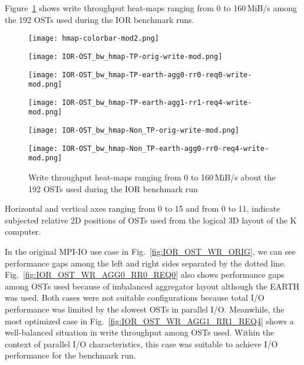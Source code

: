 \documentclass{jhps}
\begin{document}
Figure~\ref{fig:IOR_OST_BW_HMAP_WR} shows write throughput heat-maps
ranging from 0 to 160\,MiB/s
among the 192 OSTs used during the IOR benchmark runs.
%
\begin{figure}[tb]
\begin{minipage}[t]{0.06\textwidth}
 \texttt{[image: hmap-colorbar-mod2.png]}
\end{minipage}
%
\noindent
\begin{minipage}[t]{0.3\textwidth}
 \centering
 \texttt{[image: IOR-OST\_bw\_hmap-TP-orig-write-mod.png]}
 \label{fig:IOR_OST_WR_ORIG}
\end{minipage}
%
\noindent
\begin{minipage}[t]{0.3\textwidth}
 \centering
 \texttt{[image: IOR-OST\_bw\_hmap-TP-earth-agg0-rr0-req0-write-mod.png]}
 \label{fig:IOR_OST_WR_AGG0_RR0_REQ0}
\end{minipage}
%
\noindent
\begin{minipage}[t]{0.3\textwidth}
 \centering
 \texttt{[image: IOR-OST\_bw\_hmap-TP-earth-agg1-rr1-req4-write-mod.png]}
 \label{fig:IOR_OST_WR_AGG1_RR1_REQ4}
\end{minipage}
%
\begin{minipage}[t]{0.3\textwidth}
 \centering
 \texttt{[image: IOR-OST\_bw\_hmap-Non\_TP-orig-write-mod.png]}
 \label{fig:IOR_OST_WR_NTP_ORIG}
\end{minipage}
%
\begin{minipage}[t]{0.3\textwidth}
 \centering
 \texttt{[image: IOR-OST\_bw\_hmap-Non\_TP-earth-agg0-rr0-req4-write-mod.png]}
 \label{fig:IOR_OST_WR_NTP_AGG0_RR0_REQ4}
\end{minipage}
%
\caption{Write throughput heat-maps ranging from 0 to 160\,MiB/s
about the 192 OSTs used during the IOR benchmark run}
\label{fig:IOR_OST_BW_HMAP_WR}
\end{figure}
%
Horizontal and vertical axes ranging from 0 to 15 and from 0 to 11,
indicate subjected relative 2D positions of OSTs used from the logical 3D layout
of the K computer.

In the original MPI-IO use case in Fig.~\ref{fig:IOR_OST_WR_ORIG},
we can see performance gaps among the left and right sides separated by
the dotted line.
Fig.~\ref{fig:IOR_OST_WR_AGG0_RR0_REQ0}
also shows performance gaps among OSTs used
because of imbalanced aggregator layout although the EARTH was used.
Both cases were not suitable configurations because total I/O performance
was limited by the slowest OSTs in parallel I/O.
Meanwhile, the most optimized case in Fig.~\ref{fig:IOR_OST_WR_AGG1_RR1_REQ4}
shows a well-balanced situation in write throughput among OSTs used.
Within the context of parallel I/O characteristics,
this case was suitable to achieve I/O performance for the benchmark run.
\end{document}
